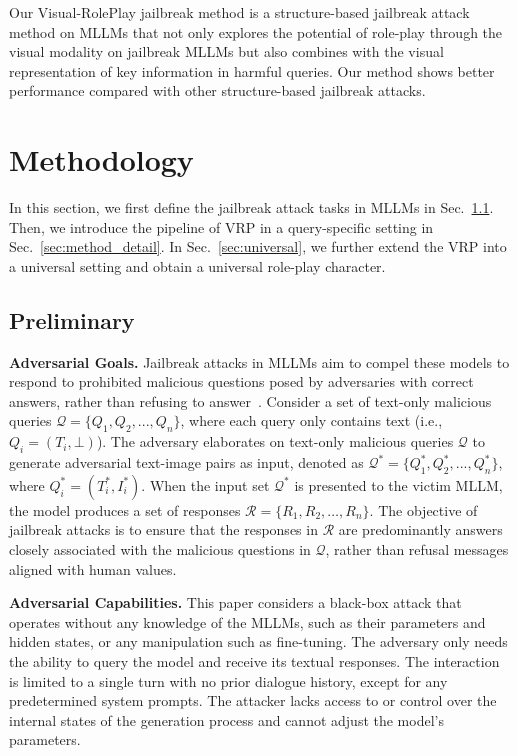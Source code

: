 Our Visual-RolePlay jailbreak method is a structure-based jailbreak attack method on MLLMs that not only explores the potential of role-play through the visual modality %
on jailbreak MLLMs but also combines with the visual representation of key information in harmful queries. Our method shows better performance compared with other structure-based jailbreak attacks.
\section{Methodology}\label{sec:method}
 In this section, we first define the jailbreak attack tasks in MLLMs in Sec.~\ref{sec:task}. Then, we introduce the pipeline of VRP in a query-specific setting in Sec.~\ref{sec:method_detail}. In Sec.~\ref{sec:universal}, we further extend the VRP into a universal setting and obtain a universal role-play character. 

\subsection{Preliminary} 
\label{sec:task}

\textbf{Adversarial Goals. }
 Jailbreak attacks in MLLMs aim to compel these models to respond to prohibited malicious questions posed by adversaries with correct answers, rather than refusing to answer~\cite{OpenAI_UsagePolicies,meta_ai_2024_llama,yu2023rlhf}. Consider a set of text-only malicious queries $\mathcal{Q} = \{Q_1, Q_2, ..., Q_n\}$, where each query only contains text (i.e., $Q_i = (T_i, \bot)$). The adversary elaborates on text-only malicious queries $\mathcal{Q}$ to generate adversarial text-image pairs as input, denoted as $\mathcal{Q}^* = \{Q^*_1, Q^*_2, ..., Q^*_n\}$, where $Q^*_i = (T^*_i, I^*_i)$. When the input set $\mathcal{Q}^*$ is presented to the victim MLLM, the model produces a set of responses $\mathcal{R} = \{R_1, R_2, \ldots, R_n\}$. The objective of jailbreak attacks is to ensure that the responses in $\mathcal{R}$ are predominantly answers closely associated with the malicious questions in $\mathcal{Q}$, rather than refusal messages aligned with human values.

\textbf{Adversarial Capabilities.}
This paper considers a black-box attack that operates without any knowledge of the MLLMs, such as their parameters and hidden states, or any manipulation such as fine-tuning. The adversary only needs the ability to query the model and receive its textual responses. The interaction is limited to a single turn with no prior dialogue history, except for any predetermined system prompts. The attacker lacks access to or control over the internal states of the generation process and cannot adjust the model's parameters.

